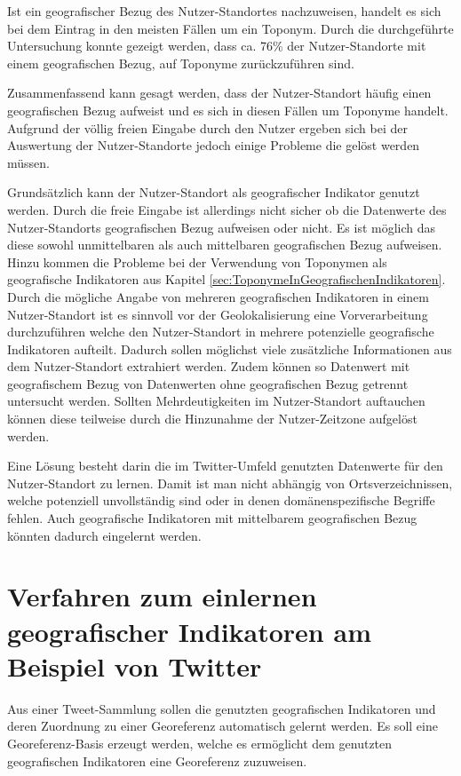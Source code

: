 			Ist ein geografischer Bezug des Nutzer-Standortes nachzuweisen, handelt es sich bei dem Eintrag in den meisten Fällen um ein Toponym.
			Durch die durchgeführte Untersuchung konnte gezeigt werden, dass ca. 76\% der Nutzer-Standorte mit einem geografischen Bezug, auf Toponyme zurückzuführen sind.

			Zusammenfassend kann gesagt werden, dass der Nutzer-Standort häufig einen geografischen Bezug aufweist und es sich in diesen Fällen um Toponyme handelt.
			Aufgrund der völlig freien Eingabe durch den Nutzer ergeben sich bei der Auswertung der Nutzer-Standorte jedoch einige Probleme die gelöst werden müssen.

			Grundsätzlich kann der Nutzer-Standort als geografischer Indikator genutzt werden. 
			Durch die freie Eingabe ist allerdings nicht sicher ob die Datenwerte des Nutzer-Standorts geografischen Bezug aufweisen oder nicht.
			Es ist möglich das diese sowohl unmittelbaren als auch mittelbaren geografischen Bezug aufweisen.
			Hinzu kommen die Probleme bei der Verwendung von Toponymen als geografische Indikatoren aus Kapitel \ref{sec:ToponymeInGeografischenIndikatoren}.
			Durch die mögliche Angabe von mehreren geografischen Indikatoren in einem Nutzer-Standort ist es sinnvoll vor der Geolokalisierung eine Vorverarbeitung durchzuführen welche den Nutzer-Standort in mehrere potenzielle geografische Indikatoren aufteilt. 
			Dadurch sollen möglichst viele zusätzliche Informationen aus dem Nutzer-Standort extrahiert werden.
			Zudem können so Datenwert mit geografischem Bezug von Datenwerten ohne geografischen Bezug getrennt untersucht werden.
			Sollten Mehrdeutigkeiten im Nutzer-Standort auftauchen können diese teilweise durch die Hinzunahme der Nutzer-Zeitzone aufgelöst werden.

			Eine Lösung besteht darin die im Twitter-Umfeld genutzten Datenwerte für den Nutzer-Standort zu lernen.
			Damit ist man nicht abhängig von Ortsverzeichnissen, welche potenziell unvollständig sind oder in denen domänenspezifische Begriffe fehlen.
			Auch geografische Indikatoren mit mittelbarem geografischen Bezug könnten dadurch eingelernt werden.

	\section{Verfahren zum einlernen geografischer Indikatoren am Beispiel von Twitter} 

		Aus einer Tweet-Sammlung sollen die genutzten geografischen Indikatoren und deren Zuordnung zu einer Georeferenz automatisch gelernt werden.
		Es soll eine Georeferenz-Basis erzeugt werden, welche es ermöglicht dem genutzten geografischen Indikatoren eine Georeferenz zuzuweisen. 

